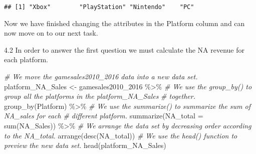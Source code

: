 \documentclass[
]{article}
\newenvironment{Shaded}{\begin{snugshade}}{\end{snugshade}}
\newcommand{\AttributeTok}[1]{\textcolor[rgb]{0.77,0.63,0.00}{#1}}
\newcommand{\CommentTok}[1]{\textcolor[rgb]{0.56,0.35,0.01}{\textit{#1}}}
\newcommand{\FunctionTok}[1]{\textcolor[rgb]{0.00,0.00,0.00}{#1}}
\newcommand{\NormalTok}[1]{#1}
\newcommand{\OtherTok}[1]{\textcolor[rgb]{0.56,0.35,0.01}{#1}}
\newcommand{\SpecialCharTok}[1]{\textcolor[rgb]{0.00,0.00,0.00}{#1}}
\newcommand{\StringTok}[1]{\textcolor[rgb]{0.31,0.60,0.02}{#1}}
\begin{document}
\begin{Shaded}
\end{Shaded}

\begin{verbatim}
## [1] "Xbox"        "PlayStation" "Nintendo"    "PC"
\end{verbatim}

Now we have finished changing the attributes in the Platform column and
can now move on to our next task.

4.2 In order to answer the first question we must calculate the NA
revenue for each platform.

\begin{Shaded}
\begin{Highlighting}[]
\CommentTok{\# We move the gamesales2010\_2016 data into a new data set.}
\NormalTok{platform\_NA\_Sales }\OtherTok{\textless{}{-}}\NormalTok{ gamesales2010\_2016 }\SpecialCharTok{\%\textgreater{}\%}
    \CommentTok{\# We use the group\_by() to group all the platforms in the platform\_NA\_Sales}
    \CommentTok{\# together.}
\FunctionTok{group\_by}\NormalTok{(Platform) }\SpecialCharTok{\%\textgreater{}\%}
    \CommentTok{\# We use the summarize() to summarize the sum of NA\_sales for each}
    \CommentTok{\# different platform.}
\FunctionTok{summarize}\NormalTok{(}\AttributeTok{NA\_total =} \FunctionTok{sum}\NormalTok{(NA\_Sales)) }\SpecialCharTok{\%\textgreater{}\%}
    \CommentTok{\# We arrange the data set by decreasing order according to the NA\_total.}
\FunctionTok{arrange}\NormalTok{(}\FunctionTok{desc}\NormalTok{(NA\_total))}
\CommentTok{\# We use the head() function to preview the new data set.}
\FunctionTok{head}\NormalTok{(platform\_NA\_Sales)}
\end{Highlighting}
\end{Shaded}
\end{document}
